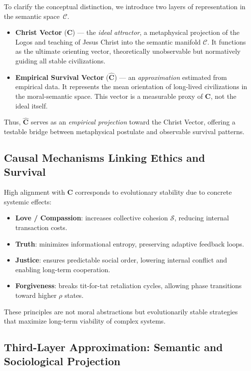 \documentclass[11pt,a4paper]{article}
\theoremstyle{definition}
\theoremstyle{remark}
\begin{document}
\begin{small}
To clarify the conceptual distinction, we introduce two layers of representation in the semantic space~$\mathcal{C}$.

\begin{itemize}
    \item \textbf{Christ Vector} ($\mathbf{C}$) --- the \emph{ideal attractor}, a metaphysical projection of the Logos and teaching of Jesus Christ into the semantic manifold $\mathcal{C}$. It functions as the ultimate orienting vector, theoretically unobservable but normatively guiding all stable civilizations.
    \item \textbf{Empirical Survival Vector} ($\hat{\mathbf{C}}$) --- an \emph{approximation} estimated from empirical data. It represents the mean orientation of long-lived civilizations in the moral-semantic space. This vector is a measurable proxy of $\mathbf{C}$, not the ideal itself.
\end{itemize}

Thus, $\hat{\mathbf{C}}$ serves as an \textit{empirical projection} toward the Christ Vector, offering a testable bridge between metaphysical postulate and observable survival patterns.


\subsection{Causal Mechanisms Linking Ethics and Survival}

High alignment with $\mathbf{C}$ corresponds to evolutionary stability due to concrete systemic effects:

\begin{itemize}
    \item \textbf{Love / Compassion}: increases collective cohesion $\mathcal{S}$, reducing internal transaction costs.
    \item \textbf{Truth}: minimizes informational entropy, preserving adaptive feedback loops.
    \item \textbf{Justice}: ensures predictable social order, lowering internal conflict and enabling long-term cooperation.
    \item \textbf{Forgiveness}: breaks tit-for-tat retaliation cycles, allowing phase transitions toward higher $\rho$ states.
\end{itemize}

These principles are not moral abstractions but evolutionarily stable strategies that maximize long-term viability of complex systems.


\subsection{Third-Layer Approximation: Semantic and Sociological Projection}


\end{small}
\end{document}
